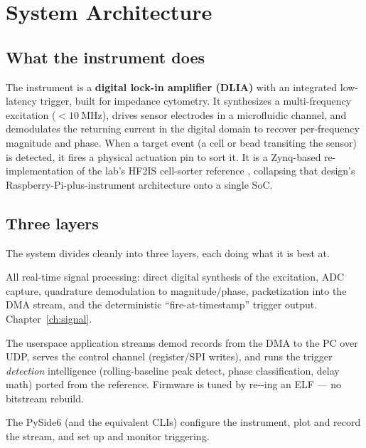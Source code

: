 \chapter{System Architecture}
\label{ch:arch}

\section{What the instrument does}
The instrument is a \textbf{digital lock-in amplifier (DLIA)} with an integrated
low-latency trigger, built for impedance cytometry. It synthesizes a
multi-frequency excitation ($<\SI{10}{\mega\hertz}$), drives sensor electrodes in
a microfluidic channel, and demodulates the returning current in the digital
domain to recover per-frequency magnitude and phase. When a target event (a cell
or bead transiting the sensor) is detected, it fires a physical actuation pin to
sort it. It is a Zynq-based re-implementation of the lab's HF2IS cell-sorter
reference \cite{hf2is}, collapsing that design's Raspberry-Pi-plus-instrument
architecture onto a single SoC.

\section{Three layers}
The system divides cleanly into three layers, each doing what it is best at.

\begin{description}[style=nextline]
  \item[PL --- Programmable Logic (FPGA fabric).] All real-time signal
    processing: direct digital synthesis of the excitation, ADC capture,
    quadrature demodulation to magnitude/phase, packetization into the DMA
    stream, and the deterministic ``fire-at-timestamp'' trigger output.
    Chapter~\ref{ch:signal}.
  \item[PS --- Processing System (dual Cortex-A9, PetaLinux).] The
     userspace application streams demod records from the DMA
    to the PC over UDP, serves the control channel (register/SPI writes), and
    runs the trigger \emph{detection} intelligence (rolling-baseline peak detect,
    phase classification, delay math) ported from the reference. Firmware is
    tuned by re--ing an ELF --- no bitstream rebuild.
  \item[PC --- Host application.] The PySide6  (and the equivalent
    CLIs) configure the instrument, plot and record the stream, and set up and
    monitor triggering.
\end{description}

